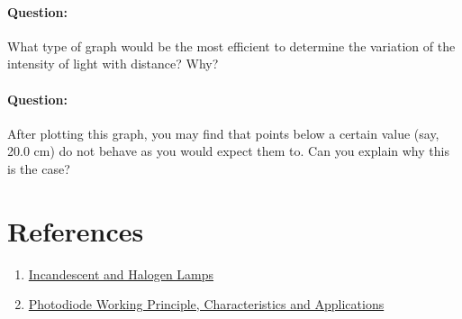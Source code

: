 \begin{question}
\paragraph{Question:} What type of graph would be the most efficient to determine the variation of the intensity of light with distance? Why? ~\\

\paragraph{Question:} After plotting this graph, you may find that points below a certain value (say, 20.0 cm) do not behave as you would expect them to. Can you explain why this is the case?
\end{question}


\section*{References}

\begin{enumerate}

\item \href{https://www.fh-muenster.de/ciw/downloads/personal/juestel/juestel/4-InkohaerenteLichtquellen-Glueh-_und_Halogenlampen_english_-1.pdf}{Incandescent and Halogen Lamps}

\item \href{https://www.elprocus.com/photodiode-working-principle-applications/}{Photodiode Working Principle, Characteristics and Applications}

\end{enumerate}



\newpage